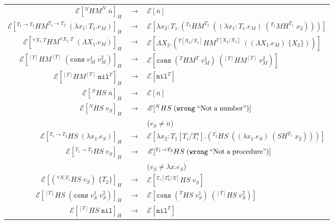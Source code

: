 \begin{figure}
\onehalfspacing
\begin{center}
\begin{tabular}{rcl}
$\mathscr{E}[^{N}HM^{N}\;\overline{n}]_{H}$ & $\rightarrow$ & $\mathscr{E}[\overline{n}]$ \\
$\mathscr{E}[^{T_{1}\rightarrow T_{2}}HM^{T_{1}\rightarrow T_{2}}\;(\lambda x_{1}:T_{1}.e_{M})]_{H}$ & $\rightarrow$ & $\mathscr{E}[\lambda x_{2}:T_{1}.(^{T_{2}}HM^{T_{2}}\;((\lambda x_{1}:T_{1}.e_{M})\;(^{T_{1}}MH^{T_{1}}\;x_{2})))]$ \\
$\mathscr{E}[^{\forall X_{1}.T}HM^{\forall X_{1}.T}\;(\Lambda X_{1}.e_{M})]_{H}$ & $\rightarrow$ & $\mathscr{E}[\Lambda X_{2}.(^{T[X_{2}/X_{1}]}HM^{T[X_{2}/X_{1}]}\;((\Lambda X_{1}.e_{M})\;\lbrace X_{2}\rbrace))]$ \\
$\mathscr{E}[^{[T]}HM^{[T]}\;(\mathtt{cons}\;v_{M}^{1}\;v_{M}^{2})]_{H}$ & $\rightarrow$ & $\mathscr{E}[\mathtt{cons}\;(^{T}HM^{T}\;v_{M}^{1})\;(^{[T]}HM^{[T]}\;v_{M}^{2})]$ \\
$\mathscr{E}[^{[T]}HM^{[T]}\;\mathtt{nil}^{T}]_{H}$ & $\rightarrow$ & $\mathscr{E}[\mathtt{nil}^{T}]$ \\
$\mathscr{E}[^{N}HS\;\overline{n}]_{H}$ & $\rightarrow$ & $\mathscr{E}[\overline{n}]$ \\
$\mathscr{E}[^{N}HS\;v_{S}]_{H}$ & $\rightarrow$ & $\mathscr{E}[^{N}HS\;(\mathtt{wrong}\;\mathrm{``Not\;a\;number"})]$ \\
&& ($v_{S}\neq\overline{n}$) \\
$\mathscr{E}[^{T_{1}\rightarrow T_{2}}HS\;(\lambda x_{1}.e_{S})]_{H}$ & $\rightarrow$ & $\mathscr{E}[\lambda x_{2}:T_{1}[T_{i}/T^{a}_{i}].(^{T_{2}}HS\;((\lambda x_{1}.e_{S})\;(SH^{T_{1}}\;x_{2})))]$ \\
$\mathscr{E}[^{T_{1}\rightarrow T_{2}}HS\;v_{S}]_{H}$ & $\rightarrow$ & $\mathscr{E}[^{T_{1}\rightarrow T_{2}}HS\;(\mathtt{wrong}\;\mathrm{``Not\;a\;procedure"})]$ \\
&& ($v_{S}\neq\lambda x.e_{S}$) \\
$\mathscr{E}[(^{\forall X.T_{1}}HS\;v_{S})\;\lbrace T_{2}\rbrace]_{H}$ & $\rightarrow$ & $\mathscr{E}[^{T_{1}[T^{a}_{2}/X]}HS\;v_{S}]$ \\
$\mathscr{E}[^{[T]}HS\;(\mathtt{cons}\;v_{S}^{1}\;v_{S}^{2})]_{H}$ & $\rightarrow$ & $\mathscr{E}[\mathtt{cons}\;(^{T}HS\;v_{S}^{1})\;(^{[T]}HS\;v_{S}^{2})]$ \\
$\mathscr{E}[^{[T]}HS\;\mathtt{nil}]_{H}$ & $\rightarrow$ & $\mathscr{E}[\mathtt{nil}^{T}]$ \\

\end{tabular}
\end{center}
\end{figure}
